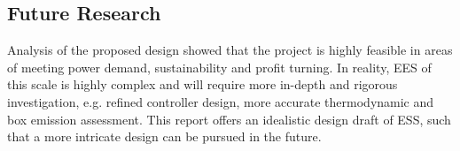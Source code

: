 \subsection{Future Research}
 Analysis of the proposed design showed that the project is highly feasible in areas of meeting power demand, sustainability and profit turning. In reality, EES of this scale is highly complex and will require more in-depth and rigorous investigation, e.g. refined controller design, more accurate thermodynamic and box emission assessment. This report offers an idealistic design draft of ESS, such that a more intricate design can be pursued in the future.
%